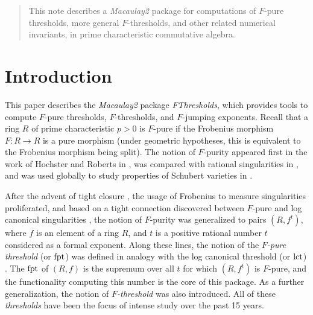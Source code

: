 \documentclass{amsart}
\begin{document}
\begin{abstract}
	This note describes a \emph{Macaulay2} package for computations of $F$-pure thresholds, more general $F$-thresholds, and other related numerical invariants, in prime characteristic commutative algebra.  
\end{abstract}




\maketitle

\section{Introduction}

This paper describes the \emph{Macaulay2} package \emph{FThresholds}, which provides tools to compute $F$-pure thresholds, $F$-thresholds, and $F$-jumping exponents.  Recall that a ring $R$ of prime characteristic $p>0$ is $F$-pure if the Frobenius morphism $F : R \to R$ is a pure morphism (under geometric hypotheses, this is equivalent to the Frobenius morphism being split).  The notion of $F$-purity appeared first in the work of Hochster and Roberts in \cite{HochsterRobertsFrobeniusLocalCohomology}, was compared with rational singularities in \cite{FedderFPureRat}, and was used globally to study properties of Schubert varieties in \cite{MehtaRamanathanFrobeniusSplittingAndCohomologyVanishing}.  

After the advent of tight closure \cite{HochsterHunekeTC1}, the usage of Frobenius to measure singularities proliferated, and based on a tight connection discovered between $F$-pure and log canonical singularities \cite{HaraWatanabeFRegFPure}, the notion of $F$-purity was generalized to pairs $(R, f^t)$, where $f$ is an element of a ring $R$, and $t$ is a positive rational number $t$ considered as a formal exponent.  Along these lines, the notion of the \emph{$F$-pure threshold} (or $\operatorname{{fpt}}$) was defined in analogy with the log canonical threshold (or $\operatorname{{lct}}$) \cite{TakagiWatanabeFPureThresh,MustataTakagiWatanabeFThresholdsAndBernsteinSato}.  The $\operatorname{{fpt}}$ of $(R, f)$ is the supremum over all $t$ for which $(R, f^t)$ is $F$-pure, and the functionality computing this number is the core of this package.  As a further generalization, the notion of \emph{$F$-threshold} was also introduced.  All of these \emph{thresholds} have been the focus of intense study over the past 15 years.
\end{document}
